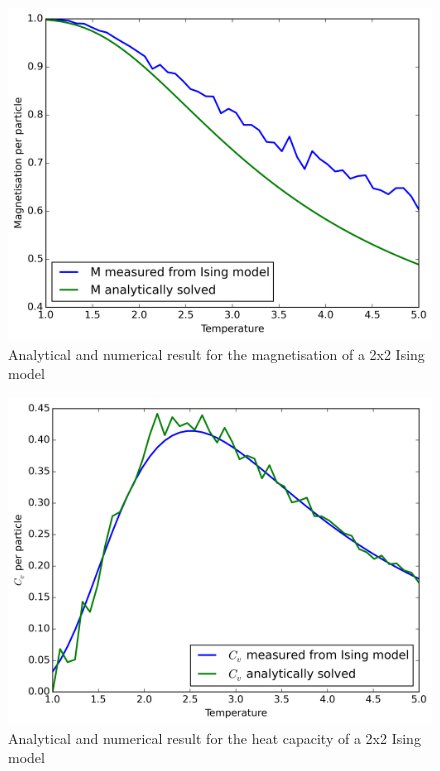 \documentclass[11pt,a4paper,english]{article}
\numberwithin{equation}{section}
\newcommand{\figurewidth}{.85\textwidth}
\begin{document}
\begin{figure}
\centering
\includegraphics[width=\figurewidth]{pics/pics4report/aM.png}
\caption{Analytical and numerical result for the magnetisation 
of a 2x2 Ising model}
\label{fig:aM}
\end{figure}

\begin{figure}
\centering
\includegraphics[width=\figurewidth]{pics/pics4report/acv.png}
\caption{Analytical and numerical result for the heat capacity 
of a 2x2 Ising model}
\label{fig:acv}
\end{figure}
\end{document}
